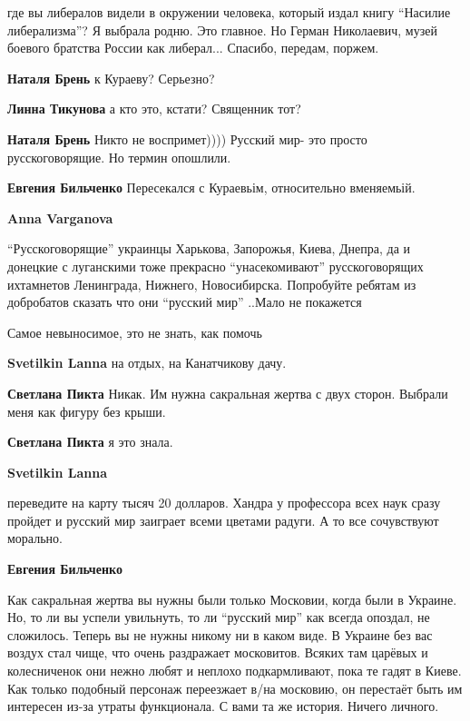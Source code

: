 \begin{itemize}
\begin{itemize}
где вы либералов видели в окружении человека, который издал книгу \enquote{Насилие
либерализма}? Я выбрала родню. Это главное. Но Герман Николаевич, музей боевого
братства России как либерал... Спасибо, передам, поржем.

\textbf{Наталя Брень} к Кураеву? Серьезно?


\textbf{Линна Тикунова} а кто это, кстати? Священник тот?

\textbf{Наталя Брень} Никто не воспримет)))) Русский мир- это просто русскоговорящие. Но термин опошлили.

\textbf{Евгения Бильченко} Пересекался с Кураевьім, относительно вменяемьій.

\textbf{Anna Varganova} 

\enquote{Русскоговорящие} украинцы Харькова, Запорожья, Киева, Днепра, да и донецкие с
луганскими тоже прекрасно \enquote{унасекомивают} русскоговорящих ихтамнетов
Ленинграда, Нижнего, Новосибирска. Попробуйте ребятам из добробатов сказать что
они \enquote{русский мир} ..Мало не покажется

\end{itemize} %

Самое невыносимое, это не знать, как помочь

\begin{itemize} %
\textbf{Svetilkin Lanna} на отдых, на Канатчикову дачу.

\textbf{Светлана Пикта} Никак. Им нужна сакральная жертва с двух сторон. Выбрали меня как фигуру без крыши.

\textbf{Светлана Пикта} я это знала.

\textbf{Svetilkin Lanna} 

переведите на карту тысяч 20 долларов. Хандра у профессора всех наук сразу
пройдет и русский мир заиграет всеми цветами радуги. А то все сочувствуют
морально.

\textbf{Евгения Бильченко} 

Как сакральная жертва вы нужны были только Московии, когда были в Украине. Но,
то ли вы успели увильнуть, то ли \enquote{русский мир} как всегда опоздал, не
сложилось. Теперь вы не нужны никому ни в каком виде. В Украине без вас воздух
стал чище, что очень раздражает московитов. Всяких там царёвых и колесниченок
они нежно любят и неплохо подкармливают, пока те гадят в Киеве. Как только
подобный персонаж переезжает в/на московию, он перестаёт быть им интересен
из-за утраты функционала. С вами та же история. Ничего личного.


\end{itemize}
\end{itemize}
